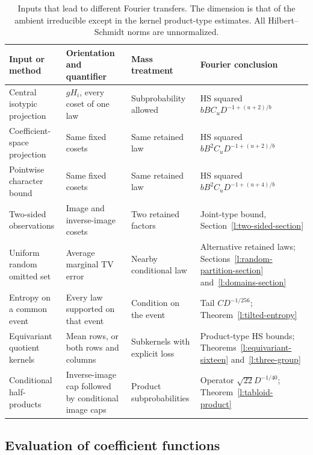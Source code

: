 \begin{table}[ht]
\centering\small
\renewcommand{\arraystretch}{1.12}
\begin{tabular}{>{\raggedright\arraybackslash}p{}>{\raggedright\arraybackslash}p{}>{\raggedright\arraybackslash}p{}>{\raggedright\arraybackslash}p{}}
\toprule
Input or method & Orientation and quantifier & Mass treatment & Fourier conclusion\\
\midrule
Central isotypic projection & $gH_i$, every coset of one law & Subprobability allowed & HS squared $bBC_uD^{-1+(u+2)/b}$\\
Coefficient-space projection & Same fixed cosets & Same retained law & HS squared $bB^2C_uD^{-1+(u+2)/b}$\\
Pointwise character bound & Same fixed cosets & Same retained law & HS squared $bB^2C_uD^{-1+(u+4)/b}$\\
Two-sided observations & Image and inverse-image cosets & Two retained factors & Joint-type bound, Section~\ref{l:two-sided-section}\\
Uniform random omitted set & Average marginal TV error & Nearby conditional law & Alternative retained laws; Sections~\ref{l:random-partition-section} and~\ref{l:domains-section}\\
Entropy on a common event & Every law supported on that event & Condition on the event & Tail $CD^{-1/256}$; Theorem~\ref{l:tilted-entropy}\\
Equivariant quotient kernels & Mean rows, or both rows and columns & Subkernels with explicit loss & Product-type HS bounds; Theorems~\ref{l:equivariant-sixteen} and~\ref{l:three-group}\\
Conditional half-products & Inverse-image cap followed by conditional image caps & Product subprobabilities & Operator $\sqrt{22}D^{-1/40}$; Theorem~\ref{l:tabloid-product}\\
\bottomrule
\end{tabular}
\caption{Inputs that lead to different Fourier transfers. The dimension is that of the ambient irreducible except in the kernel product-type estimates. All Hilbert--Schmidt norms are unnormalized.}
\label{l:comparison-table}
\end{table}

\subsection{Evaluation of coefficient functions}

